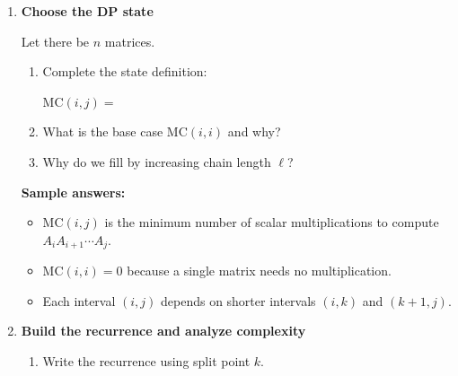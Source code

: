 \documentclass[11pt]{article}
\begin{document}
\begin{enumerate}[leftmargin=0pt, itemindent=1.7em, itemsep=1.2em]
\vspace{0.2cm}
What final value do you get for $\mathrm{MC}[1][3]$?

\vspace{1.0cm}

\ifanswers
\textbf{Sample filled table:}
\[
\begin{array}{c|ccc}
 & j=1 & j=2 & j=3 \\\hline
i=1 & 0 & 1500 & 4500 \\
i=2 &  & 0 & 9000 \\
i=3 &  &  & 0
\end{array}
\]
$\mathrm{MC}[1][3]=4500$.
\fi

\item \textbf{Choose the DP state}

Let there be $n$ matrices.

\begin{enumerate}[label=(\alph*), leftmargin=2em, itemsep=0.9em]
\item Complete the state definition:

\vspace{0.2cm}
\hspace*{1em}$\mathrm{MC}(i,j) =$ \hrulefill

\vspace{0.7cm}
\item What is the base case $\mathrm{MC}(i,i)$ and why?

\vspace{1.0cm}
\item Why do we fill by increasing chain length $\ell$?

\vspace{1.1cm}
\end{enumerate}

\ifanswers
\textbf{Sample answers:}
\begin{itemize}
    \item $\mathrm{MC}(i,j)$ is the minimum number of scalar multiplications to compute $A_iA_{i+1}\cdots A_j$.
    \item $\mathrm{MC}(i,i)=0$ because a single matrix needs no multiplication.
    \item Each interval $(i,j)$ depends on shorter intervals $(i,k)$ and $(k+1,j)$.
\end{itemize}
\fi

\newpage

\item \textbf{Build the recurrence and analyze complexity}

\begin{enumerate}[label=(\alph*), leftmargin=2em, itemsep=0.9em]
\item Write the recurrence using split point $k$.


\end{enumerate}
\end{enumerate}
\end{document}
